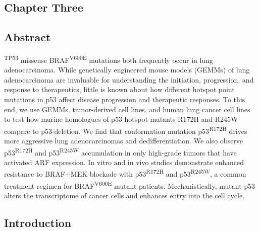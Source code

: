 \hypertarget{chapter-three}{%
\subsection{Chapter Three}\label{chapter-three}}

\hypertarget{abstract}{%
\subsection{Abstract}\label{abstract}}

\textsuperscript{TP53} missense BRAF\textsuperscript{V600E} mutations both frequently occur in lung adenocarcinoma. While genetically engineered mouse models (GEMMs) of lung adenocarcinoma are invaluable for understanding the initiation, progression, and response to therapeutics, little is known about how different hotspot point mutations in p53 affect disease progression and therapeutic responses. To this end, we use GEMMs, tumor-derived cell lines, and human lung cancer cell lines to test how murine homologues of p53 hotspot mutants R172H and R245W compare to p53-deletion. We find that conformation mutation p53\textsuperscript{R172H} drives more aggressive lung adenocarcinomas and dedifferentiation. We also observe p53\textsuperscript{R172H} and p53\textsuperscript{R245W} accumulation in only high-grade tumors that have activated ARF expression. In vitro and in vivo studies demonstrate enhanced resistance to BRAF+MEK blockade with p53\textsuperscript{R172H} and p53\textsuperscript{R245W}, a common treatment regimen for BRAF\textsuperscript{V600E} mutant patients. Mechanistically, mutant-p53 alters the transcriptome of cancer cells and enhances entry into the cell cycle.

\hypertarget{introduction-1}{%
\subsection{Introduction}\label{introduction-1}}

